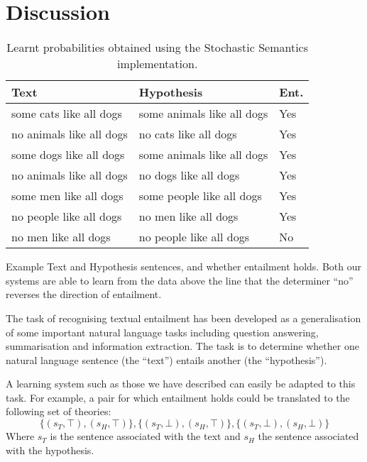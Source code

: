 \documentclass[11pt]{article}
\theoremstyle{definition}
\begin{document}
\section{Discussion}

\begin{table*}
  \parbox{.62\linewidth}{
    \begin{center}
      \begin{tabular}{|l|l|l|}
        \hline
        Text & Hypothesis & Ent.\\
        \hline
        some cats like all dogs & some animals like all dogs & Yes\\
        no animals like all dogs & no cats like all dogs & Yes\\
        some dogs like all dogs & some animals like all dogs & Yes\\
        no animals like all dogs & no dogs like all dogs & Yes\\
        some men like all dogs & some people like all dogs & Yes\\
        \hline
        no people like all dogs & no men like all dogs & Yes\\
        no men like all dogs & no people like all dogs & No\\
        \hline
      \end{tabular}
      \caption{Example Text and Hypothesis sentences, and whether
        entailment holds. Both our systems are able to learn from the
        data above the line that the determiner ``no'' reverses the
        direction of entailment.}
      \label{table:mono}
    \end{center}
  }
  \hfill
  \parbox{.32\linewidth}{
    \centering
    \caption{Learnt probabilities obtained using the
      Stochastic Semantics implementation.}
    \label{table:lexical-sato}
  }
\end{table*}

The task of recognising textual entailment \cite{Dagan:05} has been
developed as a generalisation of some important natural language tasks
including question answering, summarisation and information
extraction. The task is to determine whether one natural language
sentence (the ``text'') entails another (the ``hypothesis'').

A learning system such as those we have described can easily be
adapted to this task. For example, a pair for which entailment holds
could be translated to the following set of theories:
\[
\{(s_T,\top),(s_H,\top)\},  \{(s_T,\bot),(s_H,\top)\},\{(s_T,\bot),(s_H,\bot)\}
\]
Where $s_T$ is the sentence associated with the text and $s_H$ the
sentence associated with the hypothesis.
\end{document}
